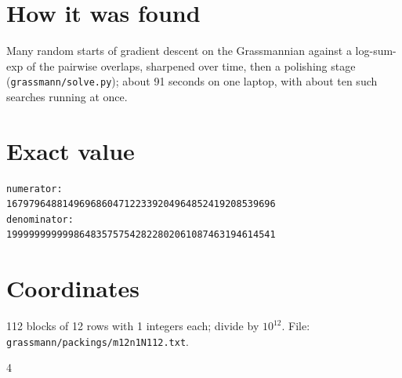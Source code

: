 \documentclass[11pt,a4paper]{article}
\begin{document}
\section{How it was found}
Many random starts of gradient descent on the Grassmannian against a log-sum-exp of the pairwise overlaps, sharpened over time, then a polishing stage (\texttt{grassmann/solve.py}); about 91 seconds on one laptop, with about ten such searches running at once.


\appendix
\section{Exact value}
{\small
\begin{verbatim}
numerator:
167979648814969686047122339204964852419208539696
denominator:
199999999999864835757542822802061087463194614541
\end{verbatim}}

\section{Coordinates}
112 blocks of 12 rows with 1 integers each; divide by $10^{12}$. File: \texttt{grassmann/packings/m12n1N112.txt}.
{\tiny
\begin{multicols}{4}
\end{multicols}}
\end{document}
